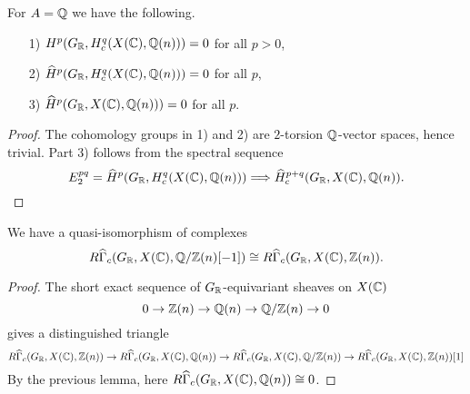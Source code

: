 \documentclass{article}
\numberwithin{equation}{section}
\begin{document}
\begin{lemma}
  For $A = \mathbb{Q}$ we have the following.

  \begin{enumerate}
  \item[1)] $H^p (G_{\mathbb{R}}, H_c^q (X (\mathbb{C}), \mathbb{Q} (n))) = 0$ for all $p > 0$,

  \item[2)] $\widehat{H}^p (G_{\mathbb{R}}, H_c^q (X (\mathbb{C}), \mathbb{Q} (n))) = 0$ for all $p$,

  \item[3)] $\widehat{H}^p (G_{\mathbb{R}}, X (\mathbb{C}), \mathbb{Q} (n))) = 0$ for all $p$.
  \end{enumerate}

  \begin{proof}
    The cohomology groups in 1) and 2) are $2$-torsion $\mathbb{Q}$-vector spaces,
    hence trivial. Part 3) follows from the spectral sequence
    \[ E_2^{pq} = \widehat{H}^p (G_{\mathbb{R}}, H^q_c (X (\mathbb{C}), \mathbb{Q} (n)))
    \Longrightarrow
    \widehat{H}^{p+q}_c (G_{\mathbb{R}}, X (\mathbb{C}), \mathbb{Q} (n)). \qedhere \]
  \end{proof}
\end{lemma}

\begin{lemma}
  We have a quasi-isomorphism of complexes
  \[ R\widehat{\Gamma}_c (G_{\mathbb{R}}, X (\mathbb{C}), \mathbb{Q}/\mathbb{Z} (n) [-1]) \cong
  R\widehat{\Gamma}_c (G_{\mathbb{R}}, X (\mathbb{C}), \mathbb{Z} (n)).\]

  \begin{proof}
    The short exact sequence of $G_{\mathbb{R}}$-equivariant sheaves on $X (\mathbb{C})$
    $$0 \to \mathbb{Z} (n) \to \mathbb{Q} (n) \to \mathbb{Q}/\mathbb{Z} (n) \to 0$$
    gives a distinguished triangle
    \[ R\widehat{\Gamma}_c (G_{\mathbb{R}}, X (\mathbb{C}), \mathbb{Z} (n)) \to
    R\widehat{\Gamma}_c (G_{\mathbb{R}}, X (\mathbb{C}), \mathbb{Q} (n)) \to
    R\widehat{\Gamma}_c (G_{\mathbb{R}}, X (\mathbb{C}), \mathbb{Q}/\mathbb{Z} (n)) \to
    R\widehat{\Gamma}_c (G_{\mathbb{R}}, X (\mathbb{C}), \mathbb{Z} (n)) [1] \]
    By the previous lemma, here
    $R\widehat{\Gamma}_c (G_{\mathbb{R}}, X (\mathbb{C}), \mathbb{Q} (n)) \cong 0$.
  \end{proof}
\end{lemma}
\end{document}
